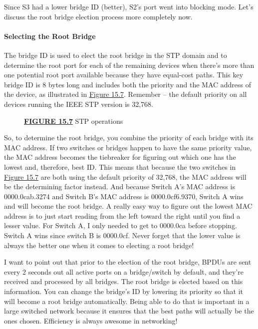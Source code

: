 Since S3 had a lower bridge ID (better), S2's port went into blocking
mode. Let's discuss the root bridge election process more completely
now.

\paragraph{Selecting the Root Bridge}

The bridge ID is used to elect the root bridge in the STP domain and to
determine the root port for each of the remaining devices when there's
more than one potential root port available because they have equal-cost
paths. This key bridge ID is 8 bytes long and includes both the priority
and the MAC address of the device, as illustrated in
\protect\hyperlink{c15.xhtmlux5cux23figure15-7}{Figure 15.7}.
Remember -- the default priority on all devices running the IEEE STP
version is 32,768.

\begin{figure}
\centering
\caption{{\protect\hyperlink{c15.xhtmlux5cux23figureanchor15-7}{\textbf{FIGURE
15.7}} STP operations}}
\end{figure}

So, to determine the root bridge, you combine the priority of each
bridge with its MAC address. If two switches or bridges happen to have
the same priority value, the MAC address becomes the tiebreaker for
figuring out which one has the lowest and, therefore, best ID. This
means that because the two switches in
\protect\hyperlink{c15.xhtmlux5cux23figure15-7}{Figure 15.7} are both
using the default priority of 32,768, the MAC address will be the
determining factor instead. And because Switch A's MAC address is
0000.0cab.3274 and Switch B's MAC address is 0000.0cf6.9370, Switch
A wins and will
become the root bridge. A really easy way to figure out the lowest MAC
address is to just start reading from the left toward the right until
you find a lesser value. For Switch A, I only needed to get to 0000.0ca
before stopping. Switch A wins since switch B is 0000.0cf. Never forget
that the lower value is always the better one when it comes to electing
a root bridge!

I want to point out that prior to the election of the root bridge, BPDUs
are sent every 2 seconds out all active ports on a bridge/switch by
default, and they're received and processed by all bridges. The root
bridge is elected based on this information. You can change the bridge's
ID by lowering its priority so that it will become a root bridge
automatically. Being able to do that is important in a large switched
network because it ensures that the best paths will actually be the ones
chosen. Efficiency is always awesome in networking!

